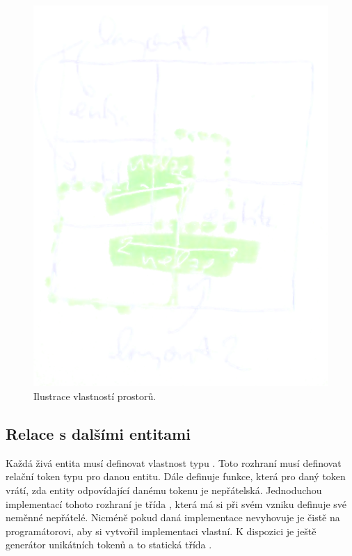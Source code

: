 \begin{figure}[H]\centering
\includegraphics[width=\textwidth]{./img/layout-manager.png}
\caption{Ilustrace vlastností prostorů. }
\label{layout-manager}
\end{figure}



\subsection{Relace s dalšími entitami}

Každá živá entita musí definovat vlastnost typu . Toto rozhraní musí definovat relační token typu
 pro danou entitu. Dále definuje funkce, která pro daný token vrátí, zda entity odpovídající danému 
tokenu je nepřátelská. Jednoduchou implementací tohoto rozhraní je třída , která má
si při svém vzniku definuje své neměnné nepřátelé. Nicméně pokud daná implementace nevyhovuje je čistě na programátorovi,
aby si vytvořil implementaci vlastní. K dispozici je ještě generátor unikátních tokenů a to statická třída .

